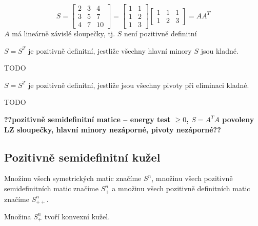 \begin{pr}
    $$
        S = 
        \begin{bmatrix}
            2 & 3 & 4 \\
            3 & 5 & 7 \\
            4 & 7 & 10
        \end{bmatrix} =
        \begin{bmatrix}
            1 & 1 \\
            1 & 2 \\
            1 & 3
        \end{bmatrix}
        \begin{bmatrix}
            1 & 1 & 1 \\
            1 & 2 & 3
        \end{bmatrix} =
        AA^T
    $$
    $A$ má lineárně závislé sloupečky, tj. $S$ není pozitivně definitní
\end{pr}

\begin{vt}
    $S = S^T$ je pozitivně definitní, jestliže všechny hlavní minory $S$ jsou kladné.
\end{vt}

\begin{pr}
    TODO
\end{pr}

\begin{vt}
    $S = S^T$ je pozitivně definitní, jestliže jsou všechny pivoty při eliminaci kladné.
\end{vt}

\begin{pr}
    TODO
\end{pr}

\noindent\textbf{??pozitivně semidefinitní matice -- energy test $\geq 0$, $S=A^TA$ povoleny LZ sloupečky, hlavní minory nezáporné, pivoty nezáporné??}

\subsection*{Pozitivně semidefinitní kužel}

Množinu všech symetrických matic značíme $S^n$, množinu všech pozitivně semidefinitních matic značíme $S_+^n$ a množinu všech pozitivně definitních matic značíme $S_{++}^n$. 

\begin{vt}
    Množina $S_+^n$ tvoří konvexní kužel.
\end{vt}

